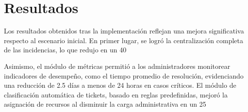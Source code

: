 \section{Resultados}
Los resultados obtenidos tras la implementación reflejan una mejora significativa respecto al escenario inicial. En primer lugar, se logró la centralización completa de las incidencias, lo que redujo en un 40%

Asimismo, el módulo de métricas permitió a los administradores monitorear indicadores de desempeño, como el tiempo promedio de resolución, evidenciando una reducción de 2.5 días a menos de 24 horas en casos críticos. El módulo de clasificación automática de tickets, basado en reglas predefinidas, mejoró la asignación de recursos al disminuir la carga administrativa en un 25%